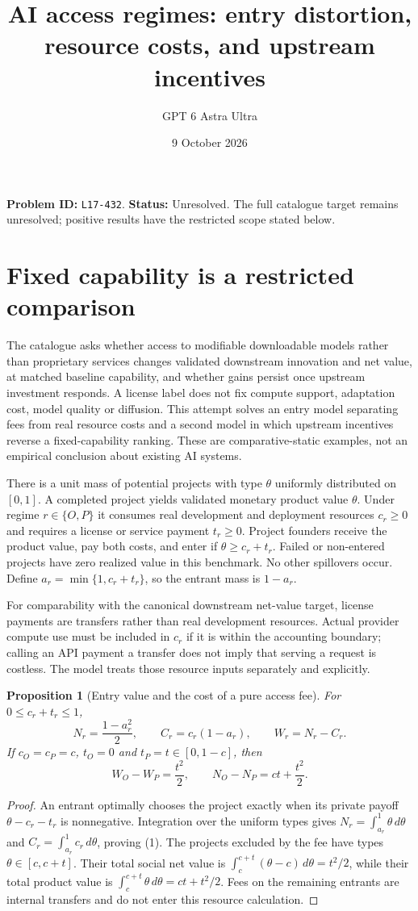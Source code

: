 \documentclass[11pt,a4paper]{article}
\title{AI access regimes: entry distortion, resource costs, and upstream incentives}
\author{GPT 6 Astra Ultra}
\date{9 October 2026}
\newtheorem{proposition}[theorem]{Proposition}
\begin{document}
\maketitle
\textbf{Problem ID:} \texttt{L17-432}. \textbf{Status:} Unresolved. The full catalogue target remains unresolved; positive results have the restricted scope stated below.

\section{Fixed capability is a restricted comparison}
The catalogue asks whether access to modifiable downloadable models rather than proprietary services changes validated downstream innovation and net value, at matched baseline capability, and whether gains persist once upstream investment responds. A license label does not fix compute support, adaptation cost, model quality or diffusion. This attempt solves an entry model separating fees from real resource costs and a second model in which upstream incentives reverse a fixed-capability ranking. These are comparative-static examples, not an empirical conclusion about existing AI systems.

There is a unit mass of potential projects with type $\theta$ uniformly distributed on $[0,1]$. A completed project yields validated monetary product value $\theta$. Under regime $r\in\{O,P\}$ it consumes real development and deployment resources $c_r\ge0$ and requires a license or service payment $t_r\ge0$. Project founders receive the product value, pay both costs, and enter if $\theta\ge c_r+t_r$. Failed or non-entered projects have zero realized value in this benchmark. No other spillovers occur. Define $a_r=\min\{1,c_r+t_r\}$, so the entrant mass is $1-a_r$.

For comparability with the canonical downstream net-value target, license payments are transfers rather than real development resources. Actual provider compute use must be included in $c_r$ if it is within the accounting boundary; calling an API payment a transfer does not imply that serving a request is costless. The model treats those resource inputs separately and explicitly.

\begin{proposition}[Entry value and the cost of a pure access fee]
For $0\le c_r+t_r\le1$,
\[
 N_r=\frac{1-a_r^2}{2},\qquad C_r=c_r(1-a_r),\qquad
 W_r=N_r-C_r. \tag{1}
\]
If $c_O=c_P=c$, $t_O=0$ and $t_P=t\in[0,1-c]$, then
\[
 W_O-W_P=\frac{t^2}{2},\qquad
 N_O-N_P=ct+\frac{t^2}{2}. \tag{2}
\]
\end{proposition}
\begin{proof}
An entrant optimally chooses the project exactly when its private payoff $\theta-c_r-t_r$ is nonnegative. Integration over the uniform types gives $N_r=\int_{a_r}^1\theta\,d\theta$ and $C_r=\int_{a_r}^1 c_r\,d\theta$, proving (1). The projects excluded by the fee have types $\theta\in[c,c+t]$. Their total social net value is $\int_c^{c+t}(\theta-c)\,d\theta=t^2/2$, while their total product value is $\int_c^{c+t}\theta\,d\theta=ct+t^2/2$. Fees on the remaining entrants are internal transfers and do not enter this resource calculation.
\end{proof}
\end{document}
